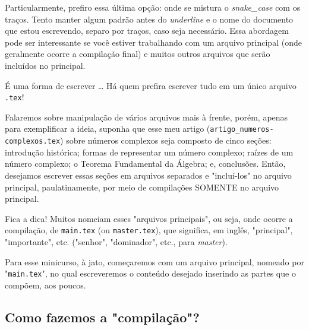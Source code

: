 Particularmente, prefiro essa última opção: onde se mistura o \textit{snake\_case}
com os traços.
Tento manter algum padrão antes do \textit{underline} e o nome do documento que 
estou escrevendo, separo por traços, caso seja necessário.
Essa abordagem pode ser interessante se você estiver trabalhando com um arquivo
principal (onde geralmente ocorre a compilação final) e muitos outros arquivos 
que serão incluídos no principal.

É uma forma de escrever \ldots
Há quem prefira escrever tudo em um único arquivo \texttt{.tex}!

Falaremos sobre manipulação de vários arquivos mais à frente, porém, apenas para
exemplificar a ideia, suponha que esse meu artigo (\texttt{artigo\_numeros-complexos.tex}) 
sobre números complexos seja composto de cinco seções:
introdução histórica; formas de representar um número complexo; raízes de um 
número complexo; o Teorema Fundamental da Álgebra; e, conclusões.
Então, desejamos escrever essas seções em arquivos separados e "incluí-los" no
arquivo principal, paulatinamente, por meio de compilações SOMENTE no arquivo
principal.

\begin{atencao}{Fica a dica!}{\exclamacao}
  Muitos nomeiam esses "arquivos principais", ou seja, onde ocorre a compilação, 
  de \texttt{main.tex} (ou \texttt{master.tex}), que significa, em inglês, 
  "principal", "importante", etc. ("senhor", "dominador", etc., para \textit{master}).
\end{atencao}

Para esse minicurso, à jato, começaremos com um arquivo principal, nomeado por
"\texttt{main.tex}", no qual escreveremos o conteúdo desejado inserindo as partes 
que o compõem, aos poucos.

\subsection{Como fazemos a "compilação"?} %


